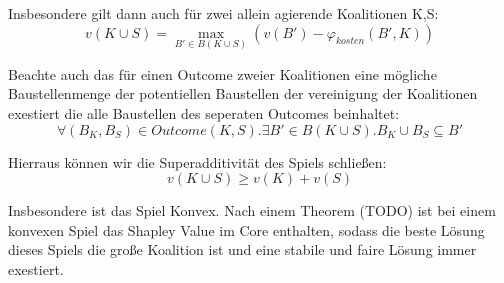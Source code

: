 \documentclass[12pt]{article}
\theoremstyle{break}
\begin{document}
Insbesondere gilt dann auch für zwei allein agierende Koalitionen K,S:
\begin{equation}
  v(K\cup S) = \max_{B'\in B(K\cup S)}(v(B')-\varphi_{kosten}(B', K))
\end{equation}

Beachte auch das für einen Outcome zweier Koalitionen eine mögliche Baustellenmenge der potentiellen Baustellen der vereinigung der Koalitionen exestiert die alle Baustellen des seperaten Outcomes beinhaltet:
\begin{equation}
  \forall (B_K, B_S)\in Outcome(K,S).\exists B'\in B(K\cup S).B_K\cup B_S\subseteq B'
\end{equation}

Hierraus können wir die Superadditivität des Spiels schließen:
\begin{equation}
  v(K\cup S) \geq v(K) + v(S)
\end{equation}


Insbesondere ist das Spiel Konvex.
Nach einem Theorem (TODO) ist bei einem konvexen Spiel das Shapley Value im Core enthalten, sodass die beste Lösung dieses Spiels die große Koalition ist und eine stabile und faire Lösung immer exestiert.





%
%
%
\end{document}
